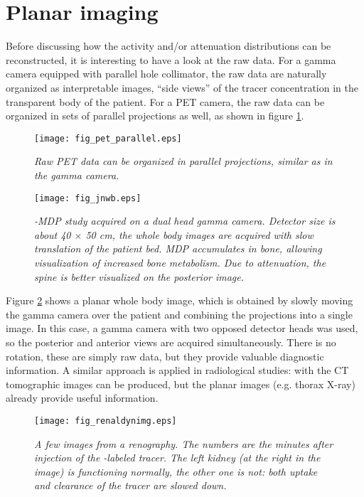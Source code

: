 \section{Planar imaging}
Before discussing how the activity and/or attenuation distributions can be
reconstructed, it is interesting to have a look at the raw data. For a gamma
camera equipped with parallel hole collimator, the raw data are naturally
organized as interpretable images, ``side views'' of the tracer concentration
in the transparent body of the patient. For a PET camera, the raw data can be
organized in sets of parallel projections as well, as shown in figure
\ref{fig:pet_parallel}. 

\begin{figure}[tb]
\centering
\texttt{[image: fig\_pet\_parallel.eps]}
\caption{\label{fig:pet_parallel} \emph{Raw PET data can be organized in
parallel projections, similar as in the gamma camera.}}
\end{figure}

\begin{figure}[tb]
\centering
\texttt{[image: fig\_jnwb.eps]}
\caption{\label{fig:planarwb} \emph{\Tc-MDP study acquired on a dual
head gamma camera. Detector size is about 40 $\times$ 50 cm, the whole body
images are acquired with slow translation of the patient bed. MDP accumulates
in bone, allowing visualization of increased bone metabolism. Due to
attenuation, the spine is better visualized on the posterior image.}}
\end{figure}

Figure \ref{fig:planarwb} shows a planar whole body image, which is obtained
by slowly moving the gamma camera over the patient and combining the
projections into a single image. In this case, a gamma camera with two opposed
detector heads was used, so the posterior and anterior views are acquired
simultaneously. There is no rotation, these are simply raw data, but they
provide valuable diagnostic information. A similar approach is applied in
radiological studies: with the CT tomographic images can be produced, but the
planar images (e.g. thorax X-ray) already provide useful information. 

\begin{figure}[tb]
\centering
\texttt{[image: fig\_renaldynimg.eps]}
\caption{\label{fig:renaldyn} \emph{A few images from a
    renography. The numbers are the minutes after injection of the
    \Tc-labeled tracer. The left kidney (at the right in the
    image) is functioning normally, the other one is not: both uptake
    and clearance of the tracer are slowed down.}}
\end{figure}

